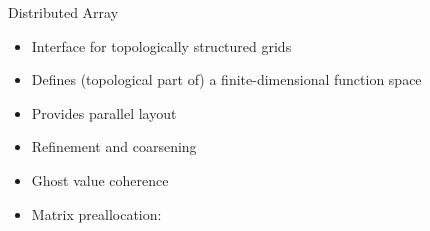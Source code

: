 
\begin{frame}{Distributed Array}
  \begin{itemize}
  \item Interface for topologically structured grids
  \item Defines (topological part of) a finite-dimensional function space
  \item Provides parallel layout
  \item Refinement and coarsening
  \item Ghost value coherence
  \item Matrix preallocation: 
  \end{itemize}
\end{frame}
